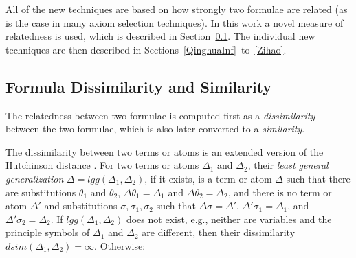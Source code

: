 \documentclass[EPiC]{easychair}
\begin{document}
All of the new techniques are based on how strongly two formulae are
related (as is the case in many axiom selection techniques).
In this work a novel measure of relatedness is used, which is described
in Section~\ref{QinghuaDistance}.
The individual new techniques are then described in 
Sections~\ref{QinghuaInf}~to~\ref{Zihao}.

\subsection{Formula Dissimilarity and Similarity}
\label{QinghuaDistance}

The relatedness between two formulae is computed first as a
\emph{dissimilarity} between the two formulae, which is also later converted
to a \emph{similarity}.

The dissimilarity between two terms or atoms is an extended version of the
Hutchinson distance \cite{Hut97}.
For two terms or atoms $\Delta_1$ and $\Delta_2$, their \emph{least general 
generalization} $\Delta = lgg(\Delta_1,\Delta_2)$, if it exists, is a term 
or atom $\Delta$ such that there are substitutions $\theta_1$ and $\theta_2$, 
$\Delta\theta_1 = \Delta_1$ and $\Delta\theta_2 = \Delta_2$, and 
there is no term or atom $\Delta'$ and substitutions 
$\sigma, \sigma_1, \sigma_2$ such that 
$\Delta\sigma = \Delta'$, $\Delta'\sigma_1 = \Delta_1$, 
and $\Delta'\sigma_2 = \Delta_2$.
If $lgg(\Delta_1,\Delta_2)$ does not exist, e.g., neither are variables and 
the principle symbols of $\Delta_1$ and $\Delta_2$ are different, then their 
dissimilarity $dsim(\Delta_1,\Delta_2) = \infty$.
Otherwise:
\end{document}
